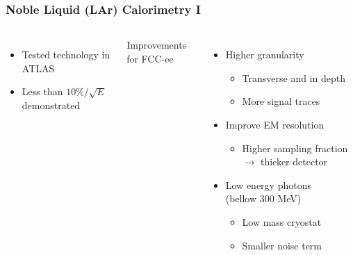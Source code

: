 \documentclass[aspectratio=169]{beamer}
\newcommand{\bluetext}[1]{%
  \textcolor{myBlue}{#1}
}
\begin{document}
\begin{frame}
  \frametitle{Noble Liquid (LAr) Calorimetry I}

  \begin{columns}[c]
    \begin{itemize}
      \item Tested technology in ATLAS
      \item Less than $10\%/\sqrt{E}$ demonstrated
    \end{itemize}

    \bluetext{Improvements for FCC-ee}
    \begin{itemize}
      \item Higher granularity
            \begin{itemize}
              \item Transverse and in depth
              \item More signal traces
            \end{itemize}
      \item Improve EM resolution
            \begin{itemize}
              \item Higher sampling fraction $\rightarrow$ thicker detector
            \end{itemize}
      \item Low energy photons \\
            (bellow 300 MeV)
            \begin{itemize}
              \item Low mass cryostat
              \item Smaller noise term
            \end{itemize}
    \end{itemize}


\end{columns}
\end{frame}
\end{document}
